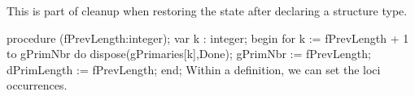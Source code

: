 This is part of cleanup when restoring the state after declaring a
structure type.

\nwenddocs{}\endmoddef\nwstartdeflinemarkup{}\nwenddeflinemarkup
procedure (fPrevLength:integer);
var
   k : integer;
begin
   for k := fPrevLength + 1 to gPrimNbr do dispose(gPrimaries[k],Done);
   gPrimNbr := fPrevLength;
   dPrimLength := fPrevLength;
end;
\eatline
{}\nwendcode{}\nwdocspar
Within a definition, we can set the loci occurrences.

